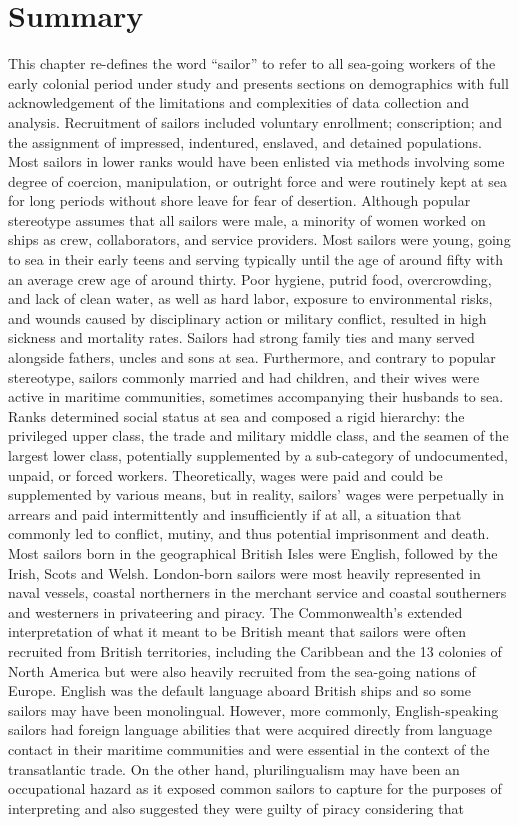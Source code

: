 \section{{Summary}}%

  This chapter re-defines the word “sailor” to refer to all sea-going workers of the early colonial period under study and presents sections on demographics with full acknowledgement of the limitations and complexities of data collection and analysis. Recruitment of sailors included voluntary enrollment; conscription; and the assignment of impressed, indentured, enslaved, and detained populations. Most sailors in lower ranks would have been enlisted via methods involving some degree of coercion, manipulation, or outright force and were routinely kept at sea for long periods without shore leave for fear of desertion. Although popular stereotype assumes that all sailors were male, a minority of women worked on ships as crew, collaborators, and service providers. Most sailors were young, going to sea in their early teens and serving typically until the age of around fifty with an average crew age of around thirty. Poor hygiene, putrid food, overcrowding, and lack of clean water, as well as hard labor, exposure to environmental risks, and wounds caused by disciplinary action or military conflict, resulted in high sickness and mortality rates. Sailors had strong family ties and many served alongside fathers, uncles and sons at sea. Furthermore, and contrary to popular stereotype, sailors commonly married and had children, and their wives were active in maritime communities, sometimes accompanying their husbands to sea. Ranks determined social status at sea and composed a rigid hierarchy: the privileged upper class, the trade and military middle class, and the seamen of the largest lower class, potentially supplemented by a sub-category of undocumented, unpaid, or forced workers. Theoretically, wages were paid and could be supplemented by various means, but in reality, sailors’ wages were perpetually in arrears and paid intermittently and insufficiently if at all, a situation that commonly led to conflict, mutiny, and thus potential imprisonment and death. Most sailors born in the geographical British Isles were English, followed by the Irish, Scots and Welsh.  London{}-born sailors were most heavily represented in naval vessels, coastal northerners in the merchant service and coastal southerners and westerners in privateering and piracy. The Commonwealth’s extended interpretation of what it meant to be British meant that sailors were often recruited from British territories, including the Caribbean and the 13 colonies of North America but were also heavily recruited from the sea-going nations of Europe. English was the default language aboard British ships and so some sailors may have been monolingual. However, more commonly, English-speaking sailors had foreign language abilities that were acquired directly from language contact in their maritime communities and were essential in the context of the transatlantic trade. On the other hand, plurilingualism may have been an occupational hazard as it exposed common sailors to capture for the purposes of interpreting and also suggested they were guilty of piracy considering that 
